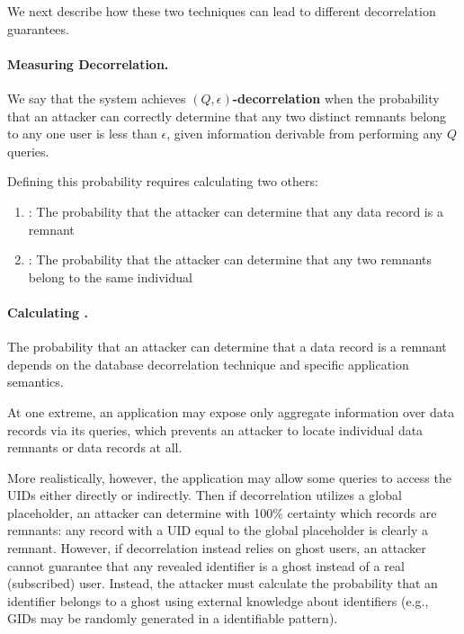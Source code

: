 We next describe how these two techniques can lead to different decorrelation guarantees.
\paragraph{Measuring Decorrelation.} 
We say that the system achieves \textbf{$(Q, \epsilon)$-decorrelation} when the probability that an
attacker can correctly determine that any two distinct remnants belong to any one user is less than
$\epsilon$, given information derivable from performing any $Q$ queries.  

Defining this probability requires calculating two others: \begin{enumerate}
    \item[\premnant{}]: 
        The probability that the attacker can determine that any data record is a remnant
    \item[\plinked{}]:
        The probability that the attacker can determine that any two remnants belong to the same individual
\end{enumerate}


\paragraph{Calculating \premnant{}.}
The probability that an attacker can determine that a data record is a remnant depends on the
database decorrelation technique and specific application semantics.

At one extreme, an application may expose only aggregate information over data records via its
queries, which prevents an attacker to locate individual data remnants or data records at all. 

More realistically, however, the application may allow some queries to access the UIDs either
directly or indirectly. Then if decorrelation utilizes a global placeholder, an attacker can
determine with 100\% certainty which records are remnants: any record with a UID equal to the global
placeholder is clearly a remnant. However, if decorrelation instead relies on ghost users, an
attacker cannot guarantee that any revealed identifier is a ghost instead of a real (subscribed)
user. Instead, the attacker must calculate the probability that an identifier belongs to a ghost
using external knowledge about identifiers (e.g., GIDs may be randomly generated in a identifiable
pattern). 

